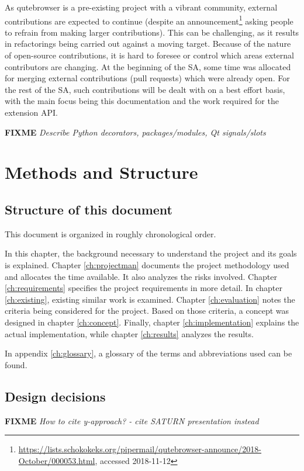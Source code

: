\documentclass[a4paper,parskip=full,DIV=14,BCOR=15mm]{scrreprt}
\newcommand{\fixme}[1]{\textbf{FIXME} \emph{#1}}
\begin{document}
As qutebrowser is a pre-existing project with a vibrant community, external
contributions are expected to continue (despite an
announcement\footnote{\url{https://lists.schokokeks.org/pipermail/qutebrowser-announce/2018-October/000053.html}, accessed 2018-11-12}
asking people to refrain from making larger contributions). This can be challenging,
as it results in refactorings being carried out against a moving target. Because
of the nature of open-source contributions,
it is hard to foresee or control which areas external contributors are changing.
At the beginning of the SA, some time was allocated for merging external
contributions (pull requests) which were already open. For the rest of the SA,
such contributions will be dealt with on a best effort basis, with the main
focus being this documentation and the work required for the extension API.

\fixme{Describe Python decorators, packages/modules, Qt signals/slots}

\section{Methods and Structure}
\subsection{Structure of this document}
This document is organized in roughly chronological order.

In this chapter, the background necessary to understand the
project and its goals is explained. Chapter \ref{ch:projectman} documents the
project methodology used and allocates the time available.
It also analyzes the risks involved. Chapter \ref{ch:requirements} specifies the
project requirements in more detail. In chapter \ref{ch:existing}, existing
similar work is examined. Chapter \ref{ch:evaluation} notes the criteria being
considered for the project. Based on those criteria, a concept was designed in chapter
\ref{ch:concept}. Finally, chapter \ref{ch:implementation} explains the actual
implementation, while chapter \ref{ch:results} analyzes the results.

In appendix \ref{ch:glossary}, a glossary of the terms and abbreviations used
can be found.

\subsection{Design decisions}
\fixme{How to cite y-approach? - cite SATURN presentation instead}
\end{document}
